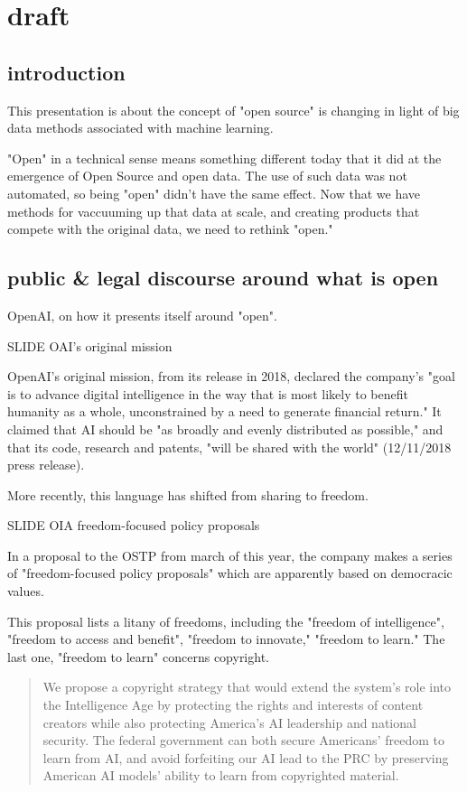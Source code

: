 \documentclass[11pt]{article}
\author{fcalado}
\date{\today}
\title{}
\begin{document}
\tableofcontents

\section{draft}
\label{sec:org3fa6a16}

\subsection{introduction}
\label{sec:org9849c72}
This presentation is about the concept of "open source" is changing in
light of big data methods associated with machine learning.

"Open" in a technical sense means something different today that it
did at the emergence of Open Source and open data. The use of such
data was not automated, so being "open" didn't have the same effect.
Now that we have methods for vaccuuming up that data at scale, and
creating products that compete with the original data, we need to
rethink "open."

\subsection{public \& legal discourse around what is open}
\label{sec:orga3db099}
OpenAI, on how it presents itself around "open".

SLIDE OAI's original mission

OpenAI's original mission, from its release in 2018, declared the
company's "goal is to advance digital intelligence in the way that is
most likely to benefit humanity as a whole, unconstrained by a need to
generate financial return." It claimed that AI should be "as broadly
and evenly distributed as possible," and that its code, research and
patents, "will be shared with the world" (12/11/2018 press release).

More recently, this language has shifted from sharing to freedom.

SLIDE OIA freedom-focused policy proposals

In a proposal to the OSTP from march of this year, the company makes a
series of "freedom-focused policy proposals" which are apparently
based on democracic values.

This proposal lists a litany of freedoms, including the "freedom of
intelligence", "freedom to access and benefit", "freedom to innovate,"
"freedom to learn." The last one, "freedom to learn" concerns
copyright.

\begin{quote}
We propose a copyright strategy that would extend the system’s role
into the Intelligence Age by protecting the rights and interests of
content creators while also protecting America’s AI leadership and
national security. The federal government can both secure Americans’
freedom to learn from AI, and avoid forfeiting our AI lead to the PRC
by preserving American AI models’ ability to learn from copyrighted
material.
\end{quote}
\end{document}
